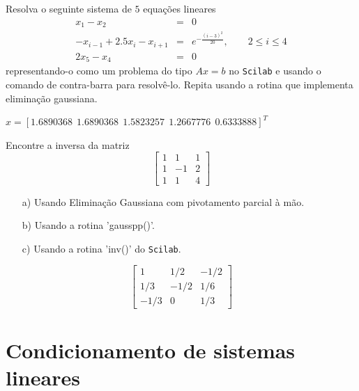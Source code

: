 \fi

\ifisscilab
\begin{Exercise}\label{trid} Resolva o seguinte sistema de $5$ equações lineares
\begin{eqnarray*}
x_1-x_2&=&0\\
-x_{i-1}+2.5x_i-x_{i+1}&=&e^{-\frac{(i-3)^2}{20}},\qquad 2\leq i \leq 4\\
2x_{5}-x_{4}&=&0
\end{eqnarray*}
representando-o como um problema do tipo $Ax=b$ no \verb+Scilab+ e usando o comando de contra-barra para resolvê-lo. Repita usando a rotina que implementa eliminação gaussiana.
\end{Exercise}
\begin{Answer}
  \begin{tiny}
 $x=[ 1.6890368  ~~  1.6890368  ~~  1.5823257  ~~  1.2667776   ~~ 0.6333888]^{T}$    
  \end{tiny}
\end{Answer}
\fi

\ifisscilab
\begin{Exercise} Encontre a inversa da matriz
$$\left[
\begin{array}{ccc}
1&1&1\\
1&-1&2\\
1&1&4
\end{array}\right]$$
\begin{itemize}
\item[a)] Usando Eliminação Gaussiana com pivotamento parcial à mão.
\item[b)] Usando a rotina 'gausspp()'.
\item[c)] Usando a rotina 'inv()' do \verb+Scilab+.
\end{itemize}
\end{Exercise}
\begin{Answer}
  \begin{tiny}
 $$ \left[ \begin {array}{ccc} 1&1/2&-1/2\\1/3&-1/2&1/6
\\-1/3&0&1/3\end {array} \right] $$    
  \end{tiny}
\end{Answer}
\fi

\section{Condicionamento de sistemas lineares}

